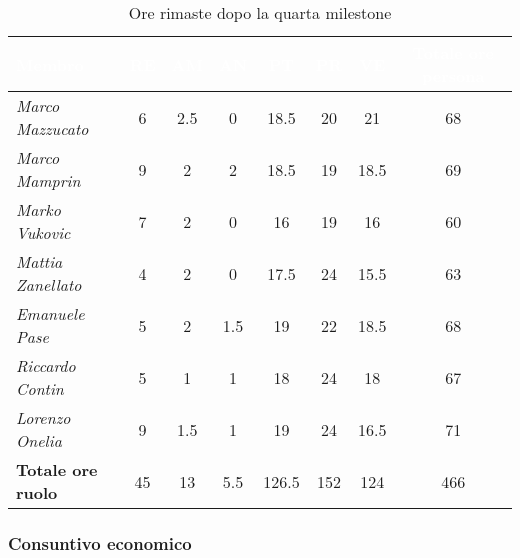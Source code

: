 \begin{table}[H]
    \renewcommand\arraystretch{1.5}
    \centering
    \begin{tabular}{|l|c|c|c|c|c|c|c|}
    \hline
    \rowcolor[HTML]{036400}
    \textcolor{white}{\textbf{Membro}} & \multicolumn{1}{c|}{\textcolor{white}{\textbf{RE}}} & \multicolumn{1}{c|}{\textcolor{white}{\textbf{AM}}} & \multicolumn{1}{c|}{\textcolor{white}{\textbf{AN}}} & \multicolumn{1}{c|}{\textcolor{white}{\textbf{PT}}} & \multicolumn{1}{c|}{\textcolor{white}{\textbf{PR}}} & \multicolumn{1}{c|}{\textcolor{white}{\textbf{VE}}} & \multicolumn{1}{c|}{\textcolor{white}{\textbf{Totale ore persona}}} \\ \hline
    \rowcolor[HTML]{EFEFEF}\textit{Marco Mazzucato}  & 6  & 2.5  & 0     & 18.5  & 20  & 21     & 68     \\ \hline
    \rowcolor[HTML]{C0C0C0}\textit{Marco Mamprin}    & 9  & 2    & 2     & 18.5  & 19  & 18.5   & 69     \\ \hline
    \rowcolor[HTML]{EFEFEF}\textit{Marko Vukovic}    & 7  & 2    & 0     & 16    & 19  & 16     & 60     \\ \hline
    \rowcolor[HTML]{C0C0C0}\textit{Mattia Zanellato} & 4  & 2    & 0     & 17.5  & 24  & 15.5   & 63     \\ \hline
    \rowcolor[HTML]{EFEFEF}\textit{Emanuele Pase}    & 5  & 2    & 1.5   & 19    & 22  & 18.5   & 68     \\ \hline
    \rowcolor[HTML]{C0C0C0}\textit{Riccardo Contin}  & 5  & 1    & 1     & 18    & 24  & 18     & 67     \\ \hline
    \rowcolor[HTML]{EFEFEF}\textit{Lorenzo Onelia}   & 9  & 1.5  & 1     & 19    & 24  & 16.5   & 71     \\ \hline
    \rowcolor[HTML]{C0C0C0}\textbf{Totale ore ruolo} & 45 & 13   & 5.5   & 126.5 & 152 & 124    & 466    \\ \hline
    \end{tabular}
    \caption{Ore rimaste dopo la quarta milestone}
\end{table}

\subsubsection{Consuntivo economico}

